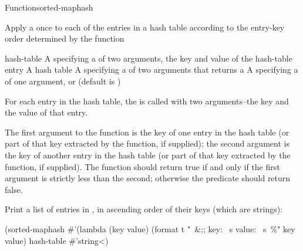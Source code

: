 \documentclass[10pt,twoside,english,pdftex]{article}
\begin{document}
\begin{functiondoc}{Function}{sorted-maphash}%
  {
    }
%

\fnsyntax

\fnpurpose Apply a  once to each of the entries in a hash
table according to the entry-key order determined by the 
function

\fnpackage {}

\fnmodule {}

\fnargs
\begin{args}{hash-table}
\arg[function] A  specifying a
  of two arguments, the key and value of the 
hash-table entry
 A hash table
\arg[predicate] A  specifying a
 of two arguments that returns a
\arg[key] A  specifying a 
of one argument, or \nil{} (default is \nil)
\end{args}

\fndescription
%
For each entry in the hash table, the  is called with two
arguments--the key and the value of that entry.

The first argument to the  function is the key of
one entry in the hash table (or part of that key extracted by the
 function, if supplied); the second argument is the key of another
entry in the hash table (or part of that key extracted by the
 function, if supplied). The  function should
return true if and only if the first argument is strictly less than the
second; otherwise the predicate should return false.

\fnexample
Print a list of entries in , in ascending order of their keys 
(which are strings):
%
\W\supp
\begin{example}
  (sorted-maphash
     #'(lambda (key value)
         (format t "~&;; key: ~s value: ~s~\%" key value)
     hash-table
     #'string<)
\end{example} 

\end{functiondoc}

\end{document}
